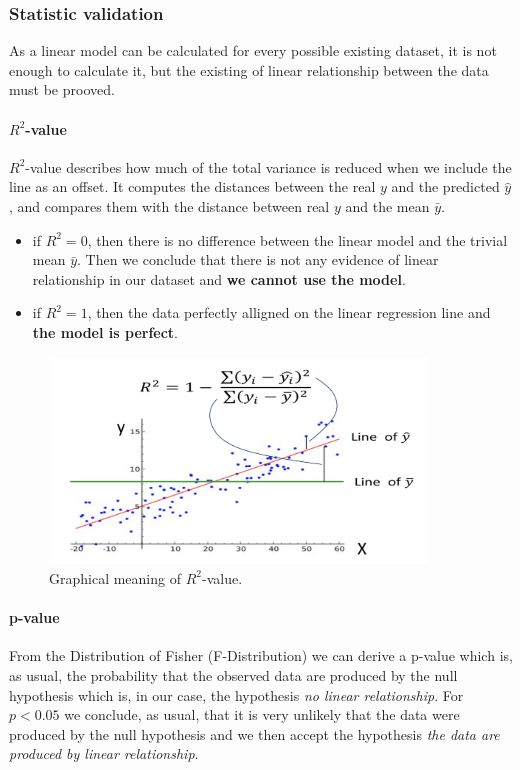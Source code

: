 \subsubsection{Statistic validation}

As a linear model can be calculated for every possible existing dataset, it is not enough to calculate it, but the existing of linear relationship between the data must be prooved.

\paragraph{$R^2$-value}

$R^2$-value describes how much of the total variance is reduced when we include the line as an offset. It computes the distances between the real $y$ and the predicted $\hat{y}$, and compares them with the distance between real $y$ and the mean $\bar{y}$.

\begin{itemize}
\item if $R^2 = 0$, then there is no difference between the linear model and the trivial mean $\bar{y}$. Then we conclude that there is not any evidence of linear relationship in our dataset and \textbf{we cannot use the model}.
\item if $R^2 = 1$, then the data perfectly alligned on the linear regression line and \textbf{the model is perfect}.
\end{itemize}

\begin{figure}[H]%
 \centering
 \includegraphics[width=10cm]{./img/07/r_2.png}
 \caption{\label{pic:r_2} Graphical meaning of $R^2$-value.}
\end{figure}


\paragraph{p-value}

From the Distribution of Fisher (F-Distribution) we can derive a p-value which is, as usual, the probability that the observed data are produced by the null hypothesis which is, in our case, the hypothesis \textit{no linear relationship}. For $p < 0.05$ we conclude, as usual, that it is very unlikely that the data were produced by the null hypothesis and we then accept the hypothesis \textit{the data are produced by linear relationship}.














